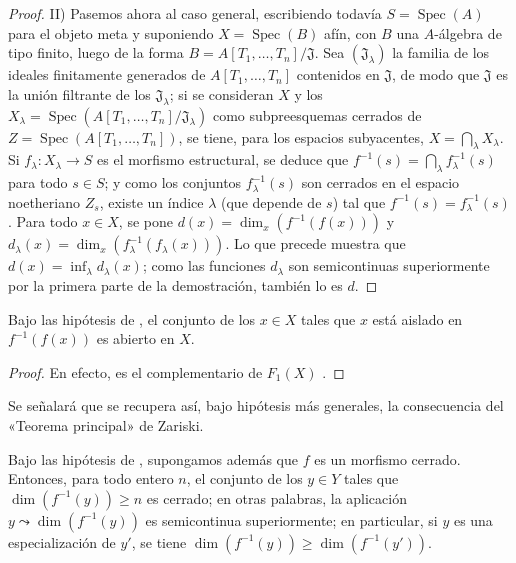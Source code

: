 \begin{proof}
II) Pasemos ahora al caso general, escribiendo todavía $S=\operatorname{Spec}(A)$ para el objeto meta y suponiendo $X=\operatorname{Spec}(B)$ afín, con $B$ una $A$-álgebra de tipo finito, luego de la forma
$B=A[T_1,\ldots,T_n]/\mathfrak J$.
Sea $(\mathfrak J_\lambda)$ la familia de los ideales finitamente generados de $A[T_1,\ldots,T_n]$ contenidos en $\mathfrak J$, de modo que $\mathfrak J$ es la unión filtrante de los $\mathfrak J_\lambda$; si se consideran $X$ y los $X_\lambda=\operatorname{Spec}(A[T_1,\ldots,T_n]/\mathfrak J_\lambda)$ como subpreesquemas cerrados de $Z=\operatorname{Spec}(A[T_1,\ldots,T_n])$, se tiene, para los espacios subyacentes, $X=\bigcap_\lambda X_\lambda$.
Si $f_\lambda:X_\lambda\to S$ es el morfismo estructural, se deduce que $f^{-1}(s)=\bigcap_\lambda f_\lambda^{-1}(s)$ para todo $s\in S$; y como los conjuntos $f_\lambda^{-1}(s)$ son cerrados en el espacio noetheriano $Z_s$, existe un índice $\lambda$ (que depende de $s$) tal que $f^{-1}(s)=f_\lambda^{-1}(s)$.
Para todo $x\in X$, se pone $d(x)=\dim_x(f^{-1}(f(x)))$ y $d_\lambda(x)=\dim_x(f_\lambda^{-1}(f_\lambda(x)))$. Lo que precede muestra que $d(x)=\inf_\lambda d_\lambda(x)$; como las funciones $d_\lambda$ son semicontinuas superiormente por la primera parte de la demostración, también lo es $d$.
\end{proof}

\begin{corollary}[13.1.4]
\label{IV.13.1.4}
Bajo las hipótesis de , el conjunto de los $x\in X$ tales que $x$ está aislado en $f^{-1}(f(x))$ es abierto en $X$.
\end{corollary}

\begin{proof}
En efecto, es el complementario de $F_1(X)$ .
\end{proof}

Se señalará que se recupera así, bajo hipótesis más generales, la consecuencia  del «Teorema principal» de Zariski.

\begin{corollary}[13.1.5]
\label{IV.13.1.5}
Bajo las hipótesis de , supongamos además que $f$ es un morfismo cerrado.
Entonces, para todo entero $n$, el conjunto de los $y\in Y$ tales que $\dim(f^{-1}(y))\geq n$ es cerrado; en otras palabras, la aplicación $y\leadsto\dim(f^{-1}(y))$ es semicontinua superiormente; en particular, si $y$ es una especialización de $y'$, se tiene $\dim(f^{-1}(y))\geq\dim(f^{-1}(y'))$.
\end{corollary}

